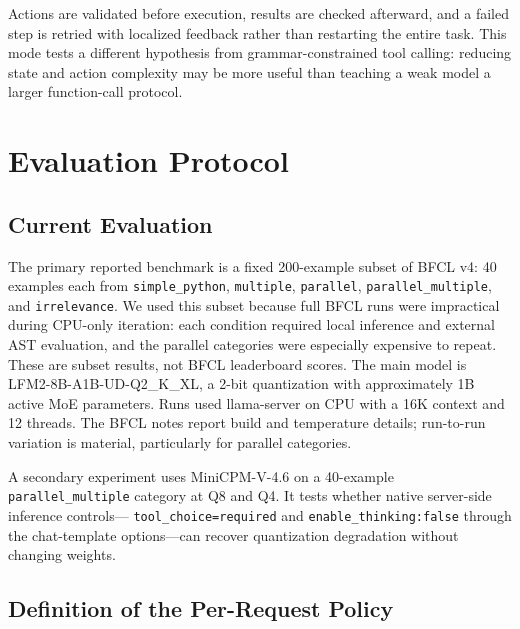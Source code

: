 \documentclass[conference]{IEEEtran}
\begin{document}
Actions are validated before execution, results are checked afterward, and a failed step is
retried with localized feedback rather than restarting the entire task. This mode tests a
different hypothesis from grammar-constrained tool calling: reducing state and action
complexity may be more useful than teaching a weak model a larger function-call protocol.

\section{Evaluation Protocol}

\subsection{Current Evaluation}

The primary reported benchmark is a fixed 200-example subset of BFCL v4: 40 examples each
from \texttt{simple\_python}, \texttt{multiple}, \texttt{parallel},
\texttt{parallel\_multiple}, and \texttt{irrelevance}. We used this subset because full BFCL
runs were impractical during CPU-only iteration: each condition required local inference and
external AST evaluation, and the parallel categories were especially expensive to repeat.
These are subset results, not BFCL leaderboard scores. The main model is LFM2-8B-A1B-UD-Q2\_K\_XL, a 2-bit quantization with
approximately 1B active MoE parameters. Runs used llama-server on CPU with a 16K context and
12 threads. The BFCL notes report build and temperature details; run-to-run variation is
material, particularly for parallel categories.

A secondary experiment uses MiniCPM-V-4.6 on a 40-example \texttt{parallel\_multiple}
category at Q8 and Q4. It tests whether native server-side inference controls---
\texttt{tool\_choice=required} and \texttt{enable\_thinking:false} through the chat-template
options---can recover quantization degradation without changing weights.

\subsection{Definition of the Per-Request Policy}
\end{document}

